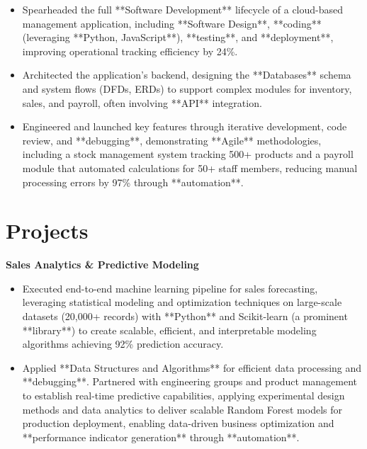 \documentclass[a4paper,10pt]{article}
\begin{document}
\begin{itemize}[leftmargin=*, itemsep=0pt, parsep=1pt] %
\vspace{-7mm}
    \item Spearheaded the full **Software Development** lifecycle of a cloud-based management application, including **Software Design**, **coding** (leveraging **Python, JavaScript**), **testing**, and **deployment**, improving operational tracking efficiency by 24\%.
    \item Architected the application's backend, designing the **Databases** schema and system flows (DFDs, ERDs) to support complex modules for inventory, sales, and payroll, often involving **API** integration.
    \item Engineered and launched key features through iterative development, code review, and **debugging**, demonstrating **Agile** methodologies, including a stock management system tracking 500+ products and a payroll module that automated calculations for 50+ staff members, reducing manual processing errors by 97\% through **automation**.
\end{itemize}

\vspace{-4mm}

\section*{Projects}
\textbf{Sales Analytics \& Predictive Modeling} \\
\begin{itemize}[leftmargin=*, itemsep=0pt, parsep=1pt]
\vspace{-7mm}
    \item Executed end-to-end machine learning pipeline for sales forecasting, leveraging statistical modeling and optimization techniques on large-scale datasets (20,000+ records) with **Python** and Scikit-learn (a prominent **library**) to create scalable, efficient, and interpretable modeling algorithms achieving 92\% prediction accuracy.
    \item Applied **Data Structures and Algorithms** for efficient data processing and **debugging**. Partnered with engineering groups and product management to establish real-time predictive capabilities, applying experimental design methods and data analytics to deliver scalable Random Forest models for production deployment, enabling data-driven business optimization and **performance indicator generation** through **automation**.
    \end{itemize}
\end{document}
